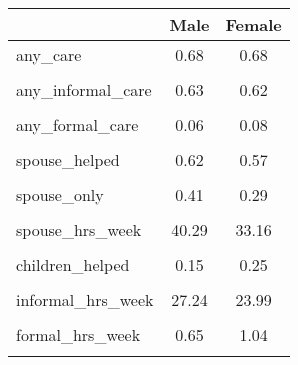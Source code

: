 \begin{tabular}{l*{2}{c}}
\hline\hline
                    &        Male&      Female\\
\hline
any\_care            &        0.68&        0.68\\
                    &            &            \\
[1em]
any\_informal\_care   &        0.63&        0.62\\
                    &            &            \\
[1em]
any\_formal\_care     &        0.06&        0.08\\
                    &            &            \\
[1em]
spouse\_helped       &        0.62&        0.57\\
                    &            &            \\
[1em]
spouse\_only         &        0.41&        0.29\\
                    &            &            \\
[1em]
spouse\_hrs\_week     &       40.29&       33.16\\
                    &            &            \\
[1em]
children\_helped     &        0.15&        0.25\\
                    &            &            \\
[1em]
informal\_hrs\_week   &       27.24&       23.99\\
                    &            &            \\
[1em]
formal\_hrs\_week     &        0.65&        1.04\\
                    &            &            \\
\hline\hline
\end{tabular}
